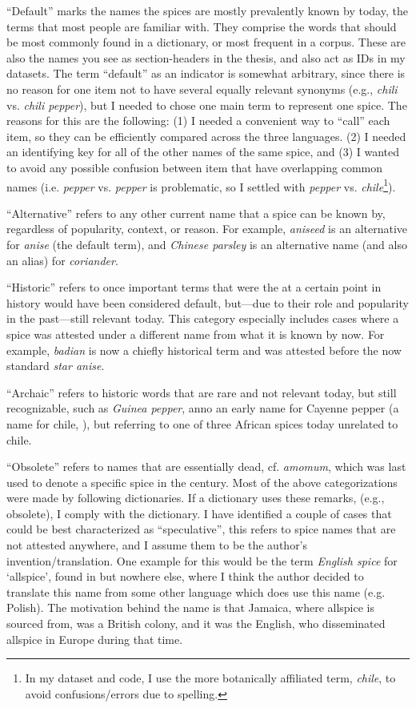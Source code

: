 ``Default'' marks the names the spices are mostly prevalently known by today, the terms that most people are familiar with. They comprise the words that should be most commonly found in a dictionary, or most frequent in a corpus. These are also the names you see as section-headers in the thesis, and also act as IDs in my datasets. The term ``default'' as an indicator is somewhat arbitrary, since there is no reason for one item not to have several equally relevant synonyms (e.g., \textit{chili} vs. \textit{chili pepper}), but I needed to chose one main term to represent one spice. The reasons for this are the following: (1) I needed a convenient way to ``call'' each item, so they can be efficiently compared across the three languages. (2) I needed an identifying key for all of the other names of the same spice, and (3) I wanted to avoid any possible confusion between item that have overlapping common names (i.e. \textit{pepper} vs. \textit{pepper} is problematic, so I settled with \textit{pepper} vs. \textit{chile}\footnote{In my dataset and code, I use the more botanically affiliated term, \textit{chile}, to avoid confusions/errors due to spelling.}).

``Alternative'' refers to any other current name that a spice can be known by, regardless of popularity, context, or reason. For example, \textit{aniseed} is an alternative for \textit{anise} (the default term), and \textit{Chinese parsley} is an alternative name (and also an alias) for \textit{coriander}.

``Historic'' refers to once important terms that were the at a certain point in history would have been considered default, but---due to their role and popularity in the past---still relevant today. This category especially includes cases where a spice was attested under a different name from what it is known by now. For example, \textit{badian} is now a chiefly historical term and was attested before the now standard \textit{star anise}.

``Archaic'' refers to historic words that are rare and not relevant today, but still recognizable, such as \textit{Guinea pepper}, anno an early name for Cayenne pepper (a name for chile, ), but referring to one of three African spices today unrelated to chile.

``Obsolete'' refers to names that are essentially dead, cf. \textit{amomum}, which was last used to denote a specific spice in the  century. Most of the above categorizations were made by following dictionaries. If a dictionary uses these remarks, (e.g., obsolete), I comply with the dictionary. 
I have identified a couple of cases that could be best characterized as ``speculative'', this refers to spice names that are not attested anywhere, and I assume them to be the author's invention/translation. 
One example for this would be the term \textit{English spice} for `allspice', found in \textcite[64]{raghavan_handbook_2007} but nowhere else, where I think the author decided to translate this name from some other language which does use this name (e.g. Polish). The motivation behind the name is that Jamaica, where allspice is sourced from, was a British colony, and it was the English, who disseminated allspice in Europe during that time.

